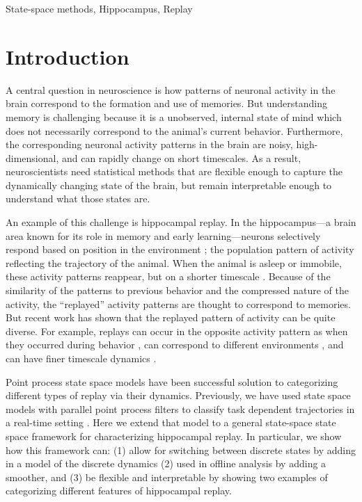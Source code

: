 \documentclass[conference]{IEEEtran}
\begin{document}
\begin{IEEEkeywords}
State-space methods, Hippocampus, Replay
\end{IEEEkeywords}

\section{Introduction}
A central question in neuroscience is how patterns of neuronal activity in the brain correspond to the formation and use of memories. But understanding memory is challenging because it is a unobserved, internal state of mind which does not necessarily correspond to the animal’s current behavior. Furthermore, the corresponding neuronal activity patterns in the brain are noisy, high-dimensional, and can rapidly change on short timescales. As a result, neuroscientists need statistical methods that are flexible enough to capture the dynamically changing state of the brain, but remain interpretable enough to understand what those states are.

An example of this challenge is hippocampal replay. In the hippocampus---a brain area known for its role in memory and early learning---neurons selectively respond based on position in the environment \cite{OKeefehippocampusspatialmap1971}; the population pattern of activity reflecting the trajectory of the animal. When the animal is asleep or immobile, these activity patterns reappear, but on a shorter timescale \cite{WilsonReactivationhippocampalensemble1994, NadasdyReplayTimeCompression1999}. Because of the similarity of the patterns to previous behavior and the compressed nature of the activity, the “replayed” activity patterns are thought to correspond to memories. But recent work has shown that the replayed pattern of activity can be quite diverse. For example, replays can occur in the opposite activity pattern as when they occurred during behavior \cite{FosterReversereplaybehavioural2006, DibaForwardreversehippocampal2007}, can correspond to different environments \cite{KarlssonAwakereplayremote2009}, and can have finer timescale dynamics \cite{PfeifferAutoassociativedynamicsgeneration2015}.

Point process state space models have been successful solution to categorizing different types of replay via their dynamics. Previously, we have used state space models with parallel point process filters to classify task dependent trajectories in a real-time setting \cite{DengRapidclassificationhippocampal2016}. Here we extend that model to a general state-space state space framework for characterizing hippocampal replay. In particular, we show how this framework can: (1) allow for switching between discrete states by adding in a model of the discrete dynamics (2) used in offline analysis by adding a smoother, and (3) be flexible and interpretable by showing two examples of categorizing different features of hippocampal replay.
\end{document}
